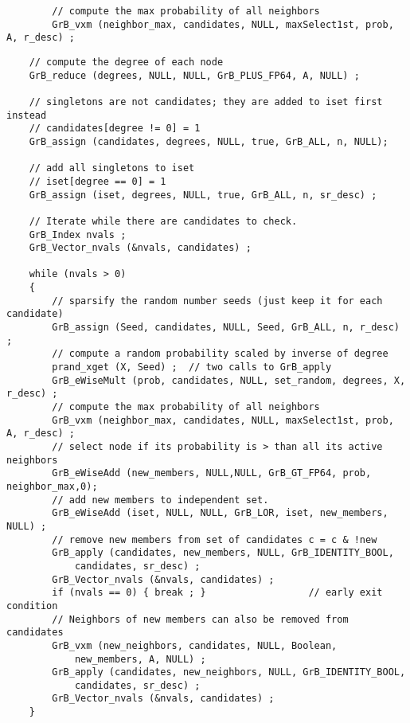 \documentclass[12pt]{article}
\begin{document}
        {\footnotesize
        \begin{verbatim}
        // compute the max probability of all neighbors
        GrB_vxm (neighbor_max, candidates, NULL, maxSelect1st, prob, A, r_desc) ; \end{verbatim}}

\newpage
\begin{mdframed}[userdefinedwidth=6in]
{\footnotesize
\begin{verbatim}
    // compute the degree of each node
    GrB_reduce (degrees, NULL, NULL, GrB_PLUS_FP64, A, NULL) ;

    // singletons are not candidates; they are added to iset first instead
    // candidates[degree != 0] = 1
    GrB_assign (candidates, degrees, NULL, true, GrB_ALL, n, NULL);

    // add all singletons to iset
    // iset[degree == 0] = 1
    GrB_assign (iset, degrees, NULL, true, GrB_ALL, n, sr_desc) ;

    // Iterate while there are candidates to check.
    GrB_Index nvals ;
    GrB_Vector_nvals (&nvals, candidates) ;

    while (nvals > 0)
    {
        // sparsify the random number seeds (just keep it for each candidate) 
        GrB_assign (Seed, candidates, NULL, Seed, GrB_ALL, n, r_desc) ;
        // compute a random probability scaled by inverse of degree
        prand_xget (X, Seed) ;  // two calls to GrB_apply
        GrB_eWiseMult (prob, candidates, NULL, set_random, degrees, X, r_desc) ;
        // compute the max probability of all neighbors
        GrB_vxm (neighbor_max, candidates, NULL, maxSelect1st, prob, A, r_desc) ;
        // select node if its probability is > than all its active neighbors
        GrB_eWiseAdd (new_members, NULL,NULL, GrB_GT_FP64, prob, neighbor_max,0);
        // add new members to independent set.
        GrB_eWiseAdd (iset, NULL, NULL, GrB_LOR, iset, new_members, NULL) ;
        // remove new members from set of candidates c = c & !new
        GrB_apply (candidates, new_members, NULL, GrB_IDENTITY_BOOL,
            candidates, sr_desc) ;
        GrB_Vector_nvals (&nvals, candidates) ;
        if (nvals == 0) { break ; }                  // early exit condition
        // Neighbors of new members can also be removed from candidates
        GrB_vxm (new_neighbors, candidates, NULL, Boolean,
            new_members, A, NULL) ;
        GrB_apply (candidates, new_neighbors, NULL, GrB_IDENTITY_BOOL,
            candidates, sr_desc) ;
        GrB_Vector_nvals (&nvals, candidates) ;
    }
\end{verbatim}}
\end{mdframed}
\end{document}
